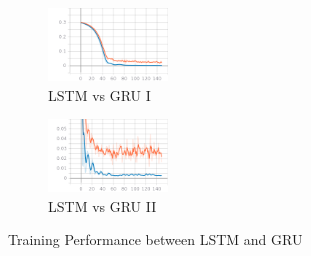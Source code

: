 \begin{figure}[h!]
	\centering
	\begin{subfigure}{.5\textwidth}
		\includegraphics[width=0.35\textwidth]{fig/trg.png}
		\caption{LSTM vs GRU I}
		\label{fig:trg}
	\end{subfigure}%
	\begin{subfigure}{.5\textwidth}
			\centering
		\includegraphics[width=0.35\textwidth]{fig/train.png}
		\caption{LSTM vs GRU II}
		\label{fig:train}
	\end{subfigure}	
	\caption{Training Performance between LSTM and GRU}
\end{figure}
